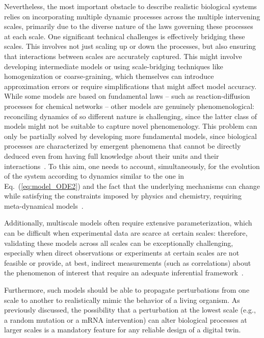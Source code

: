 \documentclass[12pt]{article}
\renewcommand{\(}{\left(}
\renewcommand{\)}{\right)}
\renewcommand{\[}{\left[}
\renewcommand{\]}{\right]}
\begin{document}
Nevertheless, the most important obstacle to describe realistic biological systems relies on incorporating multiple dynamic processes across the multiple intervening scales, primarily due to the diverse nature of the laws governing these processes at each scale. One significant technical challenges is effectively bridging these scales. This involves not just scaling up or down the processes, but also ensuring that interactions between scales are accurately captured. This might involve developing intermediate models or using scale-bridging techniques like homogenization or coarse-graining, which themselves can introduce approximation errors or require simplifications that might affect model accuracy. While some models are based on fundamental laws -- such as reaction-diffusion processes for chemical networks -- other models are genuinely phenomenological: reconciling dynamics of so different nature is challenging, since the latter class of models might not be suitable to capture novel phenomenology. This problem can only be partially solved by developing more fundamental models, since biological processes are characterized by emergent phenomena that cannot be directly deduced even from having full knowledge about their units and their interactions~\cite{gell1994complex,holland2002complex,holland2006studying,artime2022origin}. To this aim, one needs to account, simultaneously, for the evolution of the system according to dynamics similar to the one in Eq.~(\ref{eq:model_ODE2}) and the fact that the underlying mechanisms can change while satisfying the constraints imposed by physics and chemistry, requiring meta-dynamical models~\cite{bagley1989modeling}.

Additionally, multiscale models often require extensive parameterization, which can be difficult when experimental data are scarce at certain scales: therefore, validating these models across all scales can be exceptionally challenging, especially when direct observations or experiments at certain scales are not feasible or provide, at best, indirect measurements (such as correlations) about the phenomenon of interest that require an adequate inferential framework~\cite{peel2022statistical}.

Furthermore, such models should be able to propagate perturbations from one scale to another to realistically mimic the behavior of a living organism. As previously discussed, the possibility that a perturbation at the lowest scale (e.g., a random mutation or a mRNA intervention) can alter biological processes at larger scales is a mandatory feature for any reliable design of a digital twin.
\end{document}
